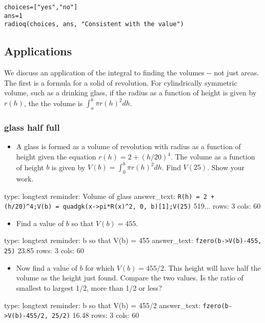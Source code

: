 \documentclass[12pt]{article}
\begin{document}
\begin{verbatim}
choices=["yes","no"]
ans=1
radioq(choices, ans, "Consistent with the value")
\end{verbatim}
\subsection{Applications}

We discuss an application of the integral to finding the volumes -{}-
not just areas. The first is a formula for a solid of revolution. For
cylindrically symmetric volume, such as a drinking glass, if the radius
as a function of height is given by $r(h)$, the the volume is
$\int_a^b \pi r(h)^2 dh$.

\subsubsection{glass half full}

\begin{itemize}
\itemsep1pt\parskip0pt
\item
  A glass is formed as a volume of revolution with radius as a function
  of height given the equation $r(h) = 2 + (h/20)^4$. The volume as a
  function of height $b$ is given by $V(b) = \int_0^b \pi   r(h)^2 dh$.
  Find $V(25)$. Show your work.
\end{itemize}

\begin{answer}
type: longtext
reminder: Volume of glass
answer_text: \verb#R(h) = 2 + (h/20)^4;V(b) = quadgk(x->pi*R(x)^2, 0, b)[1];V(25)# 519... 
rows: 3
cols: 60
\end{answer}

\begin{itemize}
\itemsep1pt\parskip0pt
\item
  Find a value of $b$ so that $V(b) = 455$.
\end{itemize}

\begin{answer}
type: longtext
reminder: b so that V(b) = 455
answer_text: \verb#fzero(b->V(b)-455, 25)# 23.85 
rows: 3
cols: 60
\end{answer}

\begin{itemize}
\itemsep1pt\parskip0pt
\item
  Now find a value of $b$ for which $V(b) = 455/2$. This height will
  have half the volume as the height just found. Compare the two values.
  Is the ratio of smallest to largest 1/2, more than 1/2 or less?
\end{itemize}

\begin{answer}
type: longtext
reminder: b so that V(b) = 455/2
answer_text: \verb#fzero(b->V(b)-455/2, 25/2)# 16.48 
rows: 3
cols: 60
\end{answer}
\end{document}
